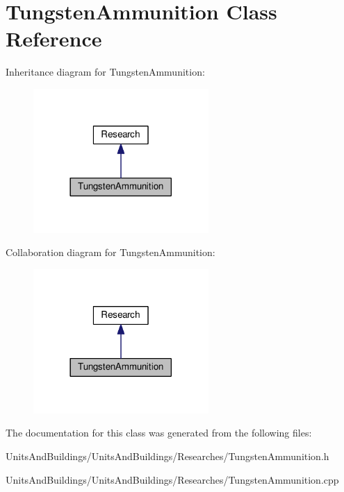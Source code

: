 \hypertarget{class_tungsten_ammunition}{}\section{Tungsten\+Ammunition Class Reference}
\label{class_tungsten_ammunition}


Inheritance diagram for Tungsten\+Ammunition\+:
\nopagebreak
\begin{figure}[H]
\begin{center}
\leavevmode
\includegraphics[width=189pt]{class_tungsten_ammunition__inherit__graph}
\end{center}
\end{figure}


Collaboration diagram for Tungsten\+Ammunition\+:
\nopagebreak
\begin{figure}[H]
\begin{center}
\leavevmode
\includegraphics[width=189pt]{class_tungsten_ammunition__coll__graph}
\end{center}
\end{figure}


The documentation for this class was generated from the following files\+:\begin{DoxyCompactItemize}
\item 
Units\+And\+Buildings/\+Units\+And\+Buildings/\+Researches/Tungsten\+Ammunition.\+h\item 
Units\+And\+Buildings/\+Units\+And\+Buildings/\+Researches/Tungsten\+Ammunition.\+cpp\end{DoxyCompactItemize}
